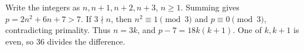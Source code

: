 Write the integers as $n,n+1,n+2,n+3$, $n\ge1$. Summing gives $p=2n^2+6n+7>7$. If $3\nmid n$, then $n^2\equiv1\pmod3$ and $p\equiv0\pmod3$, contradicting primality. Thus $n=3k$, and $p-7=18k(k+1)$. One of $k,k+1$ is even, so $36$ divides the difference.
